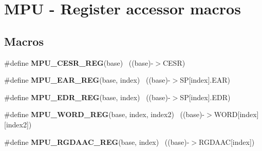 \hypertarget{group___m_p_u___register___accessor___macros}{}\section{M\+P\+U -\/ Register accessor macros}
\label{group___m_p_u___register___accessor___macros}
\subsection*{Macros}
\begin{DoxyCompactItemize}
\item 
\hypertarget{group___m_p_u___register___accessor___macros_ga384f0913132f4436b210f5471aa2bc76}{}\#define {\bfseries M\+P\+U\+\_\+\+C\+E\+S\+R\+\_\+\+R\+E\+G}(base)                                          ~((base)-\/$>$C\+E\+S\+R)\label{group___m_p_u___register___accessor___macros_ga384f0913132f4436b210f5471aa2bc76}

\item 
\hypertarget{group___m_p_u___register___accessor___macros_gafde49426a0663bf8cbd3b327071d5244}{}\#define {\bfseries M\+P\+U\+\_\+\+E\+A\+R\+\_\+\+R\+E\+G}(base,  index)                                ~((base)-\/$>$S\+P\mbox{[}index\mbox{]}.E\+A\+R)\label{group___m_p_u___register___accessor___macros_gafde49426a0663bf8cbd3b327071d5244}

\item 
\hypertarget{group___m_p_u___register___accessor___macros_gab5f1a86206f206716183f511c3530425}{}\#define {\bfseries M\+P\+U\+\_\+\+E\+D\+R\+\_\+\+R\+E\+G}(base,  index)                                ~((base)-\/$>$S\+P\mbox{[}index\mbox{]}.E\+D\+R)\label{group___m_p_u___register___accessor___macros_gab5f1a86206f206716183f511c3530425}

\item 
\hypertarget{group___m_p_u___register___accessor___macros_ga4bd0f804682db1d2e2887f98b3e45e72}{}\#define {\bfseries M\+P\+U\+\_\+\+W\+O\+R\+D\+\_\+\+R\+E\+G}(base,  index,  index2)                ~((base)-\/$>$W\+O\+R\+D\mbox{[}index\mbox{]}\mbox{[}index2\mbox{]})\label{group___m_p_u___register___accessor___macros_ga4bd0f804682db1d2e2887f98b3e45e72}

\item 
\hypertarget{group___m_p_u___register___accessor___macros_ga23cb65d4881e41613a4fc75dda589b13}{}\#define {\bfseries M\+P\+U\+\_\+\+R\+G\+D\+A\+A\+C\+\_\+\+R\+E\+G}(base,  index)                          ~((base)-\/$>$R\+G\+D\+A\+A\+C\mbox{[}index\mbox{]})\label{group___m_p_u___register___accessor___macros_ga23cb65d4881e41613a4fc75dda589b13}


\end{DoxyCompactItemize}
